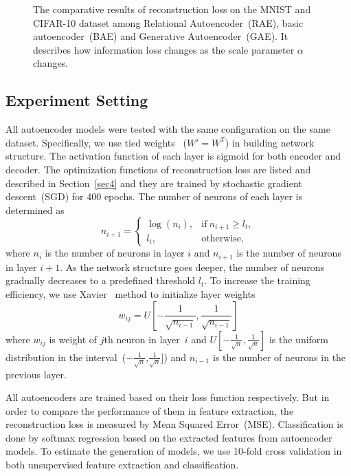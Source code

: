 \documentclass[conference]{IEEEtran}
\begin{document}
	\begin{figure*}[!t]
		\centering
		\caption{The comparative results of reconstruction loss on the MNIST and CIFAR-10 dataset among Relational Autoencoder~(RAE), basic autoencoder~(BAE) and Generative Autoencoder~(GAE). It describes how information loss changes as the scale parameter $\alpha$ changes.}
		\label{fig1}
	\end{figure*}
	
	\subsection{Experiment Setting}
	All autoencoder models were tested with the same configuration on the same dataset. Specifically, we use tied weights ~($W' = W^{T}$) in building network structure. The activation function of each layer is sigmoid for both encoder and decoder. The optimization functions of reconstruction loss are listed and described in Section~\ref{sec4} and they are trained by stochastic gradient descent~(SGD) for 400 epochs. The number of neurons of each layer is determined as
	\begin{equation}
		n_{i+1} =
		\begin{cases}
			\log(n_{i}), & \text{if}\ n_{i+1} \geq l_{t},  \\
			 l_{t},          & \text{otherwise},
		\end{cases}
	\end{equation}
	where $n_{i}$ is the number of neurons in layer $i$ and $n_{i+1}$ is the number of neurons in layer $i+1$. As the network structure goes deeper, the number of neurons gradually decreases  to a predefined threshold $l_{t}$. To increase the training efficiency, we use Xavier~\cite{glorot2010understanding} method to initialize layer weights
	\begin{equation}
	w_{ij} = U\left[-\frac{1}{\sqrt{n_{i-1}}}, \frac{1}{\sqrt{n_{i-1}}}\right]
	\end{equation}
	where $w_{ij}$ is weight of $j$th neuron in layer~$i$  and $U[-\frac{1}{\sqrt{n}}, \frac{1}{\sqrt{n}}]$ is the uniform distribution in the interval~($-\frac{1}{\sqrt{n}}$,$\frac{1}{\sqrt{n}}]$) and $n_{i-1}$ is the number of neurons in the previous layer.
	
	All autoencoders are trained based on their loss function respectively. But in order to compare the performance of them in feature extraction, the reconstruction loss is measured by Mean Squared Error~(MSE). Classification is done by softmax regression based on the extracted features from autoencoder models. To estimate the generation of models, we use 10-fold cross validation in both unsupervised feature extraction and classification.
\end{document}
